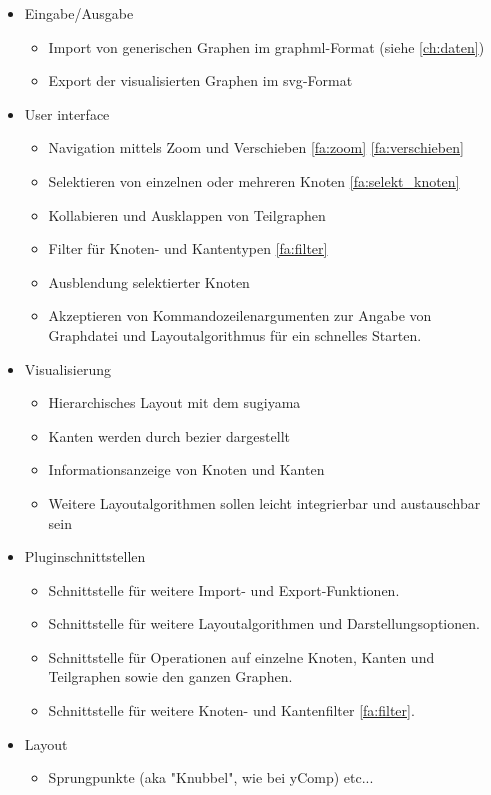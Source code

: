 \begin{itemize}
  \item Eingabe/Ausgabe
  \begin{itemize}
    \item Import von generischen Graphen im \gls{graphml}-Format (siehe \ref{ch:daten})
    \item Export der visualisierten Graphen im \gls{svg}-Format
  \end{itemize}
  \item User interface
  \begin{itemize}
    \item Navigation mittels Zoom und Verschieben \ref{fa:zoom} \ref{fa:verschieben}
    \item Selektieren von einzelnen oder mehreren Knoten \ref{fa:selekt_knoten}
    \item Kollabieren und Ausklappen von Teilgraphen %
    \item Filter für Knoten- und Kantentypen \ref{fa:filter}
    \item Ausblendung selektierter Knoten
    \item Akzeptieren von Kommandozeilenargumenten zur Angabe von Graphdatei und Layoutalgorithmus für ein schnelles Starten.
  \end{itemize}
  \item Visualisierung
  \begin{itemize}
    \item Hierarchisches Layout mit dem \gls{sugiyama}
    \item Kanten werden durch \gls{bezier} dargestellt
    \item Informationsanzeige von Knoten und Kanten
    \item Weitere Layoutalgorithmen sollen leicht integrierbar und austauschbar sein
  \end{itemize}
  \item Pluginschnittstellen
  \begin{itemize}
    \item Schnittstelle für weitere Import- und Export-Funktionen. %
    \item Schnittstelle für weitere Layoutalgorithmen und Darstellungsoptionen.
    \item Schnittstelle für Operationen auf einzelne Knoten, Kanten und Teilgraphen sowie den ganzen Graphen.
    \item Schnittstelle für weitere Knoten- und Kantenfilter \ref{fa:filter}.
  \end{itemize}
  \item Layout
  \begin{itemize}
    \item Sprungpunkte (aka "Knubbel", wie bei yComp) etc...
  \end{itemize}
\end{itemize}

